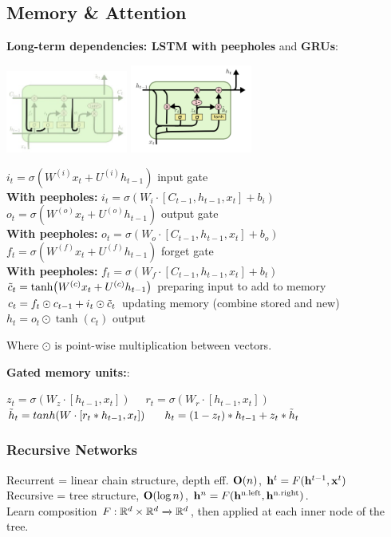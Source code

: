 \subsection{Memory \& Attention}
\label{sub:memoryandattention}
    \textbf{Long-term dependencies: LSTM with peepholes} and \textbf{GRUs}:  
    
    \includegraphics[width=4cm]{images/lstm-peepholes.png}
    \includegraphics[width=4cm]{images/gru.png}

    
    \tab $i_t=\sigma(W^{(i)}x_t+U^{(i)}h_{t-1})$ input gate\\
\textbf{With peepholes:} $i_t=\sigma(W_i\cdot [C_{t-1},h_{t-1}, x_t]+b_i)$\\
    \tab $o_t=\sigma(W^{(o)}x_t+U^{(o)}h_{t-1})$ output gate \\
\textbf{With peepholes:} $o_t=\sigma(W_o\cdot [C_{t-1},h_{t-1}, x_t]+b_o)$\\
    \tab $f_t=\sigma(W^{(f)}x_t+U^{(f)}h_{t-1})$ forget gate\\
\textbf{With peepholes:} $f_t=\sigma(W_f\cdot [C_{t-1},h_{t-1}, x_t]+b_t)$\\
    \tab $\Tilde{c}_t=\tanh(W^{(c)}x_t+U^{(c)}h_{t-1})$ preparing input to add to memory\\
    \tab $c_t=f_t\odot c_{t-1}+i_t\odot \Tilde{c}_t$ updating memory (combine stored and new)\\
    \tab $h_t=o_t\odot\tanh(c_t)$ output
    
    Where $\odot$ is point-wise multiplication between vectors.
    
    \textbf{Gated memory units:}:

    
    $z_t=\sigma(W_z \cdot [h_{t-1},x_t])$
    $\quad r_t=\sigma(W_r \cdot [h_{t-1},x_t])$\\
    $\Tilde{h}_t=tanh(W \cdot [r_t * h_{t-1},x_t])$
    $\quad h_t=(1-z_t)*h_{t-1}+z_t*\Tilde{h}_t$

    
    \subsubsection{Recursive Networks}
    \label{ssub:recursivenetworks}
    Recurrent = linear chain structure, depth eff. $\mathbf O(n)$, $\mathbf h^t=F(\mathbf h^{t-1},\mathbf x^t)$\\
    Recursive = tree structure, $\mathbf O(\log n)$, $\mathbf h^n=F(\mathbf h^\text{n.left},\mathbf h^\text{n.right})$.\\
    Learn composition $F:\mathbb R^d\times\mathbb R^d\xrightarrow{}\mathbb R^d$, then applied at each inner node of the tree.
